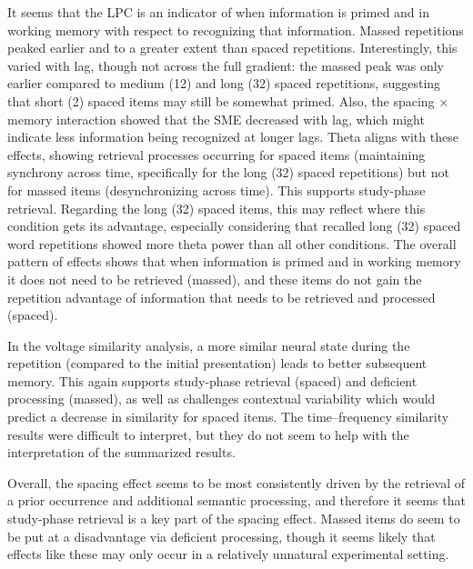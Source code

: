 It seems that the LPC is an indicator of when information is primed and in working memory with respect to recognizing that information.  Massed repetitions peaked earlier and to a greater extent than spaced repetitions.  Interestingly, this varied with lag, though not across the full gradient: the massed peak was only earlier compared to medium (12) and long (32) spaced repetitions, suggesting that short (2) spaced items may still be somewhat primed.  Also, the spacing $\times$ memory interaction showed that the SME decreased with lag, which might indicate less information being recognized at longer lags.
Theta aligns with these effects, showing retrieval processes occurring for spaced items (maintaining synchrony across time, specifically for the long (32) spaced repetitions) but not for massed items (desynchronizing across time).  This supports study-phase retrieval.  Regarding the long (32) spaced items, this may reflect where this condition gets its advantage, especially considering that recalled long (32) spaced word repetitions showed more theta power than all other conditions.
The overall pattern of effects shows that when information is primed and in working memory it does not need to be retrieved (massed), and these items do not gain the repetition advantage of information that needs to be retrieved and processed (spaced).


In the voltage similarity analysis, a more similar neural state during the repetition (compared to the initial presentation) leads to better subsequent memory.  This again supports study-phase retrieval (spaced) and deficient processing (massed), as well as challenges contextual variability which would predict a decrease in similarity for spaced items.  The time--frequency similarity results were difficult to interpret, but they do not seem to help with the interpretation of the summarized results.

Overall, the spacing effect seems to be most consistently driven by the retrieval of a prior occurrence and additional semantic processing, and therefore it seems that study-phase retrieval is a key part of the spacing effect.  Massed items do seem to be put at a disadvantage via deficient processing, though it seems likely that effects like these may only occur in a relatively unnatural experimental setting.






